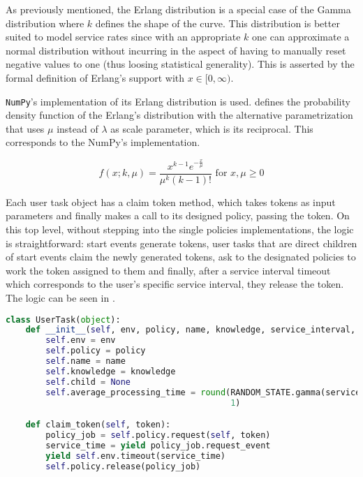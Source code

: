 \documentclass{seal_thesis}
\begin{document}
As previously mentioned, the Erlang distribution is a special case of the Gamma distribution where $k$ defines the shape of the curve. This distribution is better suited to model service rates since with an appropriate $k$ one can approximate a normal distribution without incurring in the aspect of having to manually reset negative values to one (thus loosing statistical generality). This is asserted by the formal definition of Erlang's support with $x \in [0,\infty)$.

\texttt{NumPy}'s implementation of its Erlang distribution is used.  defines the probability density function of the Erlang's distribution with the alternative parametrization that uses $\mu$ instead of $\lambda$ as scale parameter, which is its reciprocal. This corresponds to the NumPy's implementation.

\begin{equation}
\label{eq:erlang_density}
	f(x;k,\mu) = \frac{x^{k-1} e^{-\frac{x}{\mu}}}{\mu^k (k-1)!} \text{ for } x,\mu \geq 0
\end{equation}

Each user task object has a claim token method, which takes tokens as input parameters and finally makes a call to its designed policy, passing the token. On this top level, without stepping into the single policies implementations, the logic is straightforward: start events generate tokens, user tasks that are direct children of start events claim the newly generated tokens, ask to the designated policies to work the token assigned to them and finally, after a service interval timeout which corresponds to the user's specific service interval, they release the token. The logic can be seen in .

\begin{lstlisting}[caption=User task initialization,label=lst:user_task,language=Python]
    class UserTask(object):
    def __init__(self, env, policy, name, knowledge, service_interval, task_variability):
        self.env = env
        self.policy = policy
        self.name = name
        self.knowledge = knowledge
        self.child = None
        self.average_processing_time = round(RANDOM_STATE.gamma(service_interval / task_variability, task_variability),
                                             1)

    def claim_token(self, token):
        policy_job = self.policy.request(self, token)
        service_time = yield policy_job.request_event
        yield self.env.timeout(service_time)
        self.policy.release(policy_job)
\end{lstlisting}
\end{document}
